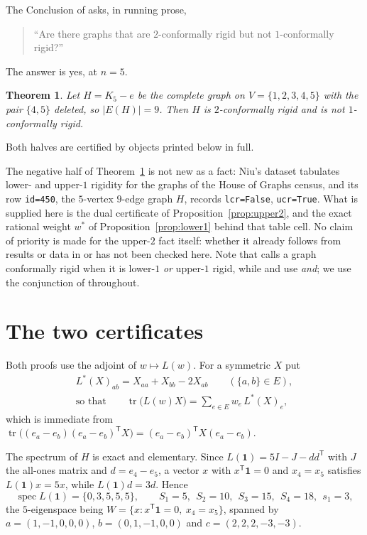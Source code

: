 \documentclass[11pt]{amsart}
\newtheorem{theorem}{Theorem}
\theoremstyle{remark}
\DeclareMathOperator{\tr}{tr}
\newcommand{\Lop}{L}
\newcommand{\Ladj}{L^{*}}
\begin{document}
The Conclusion of \cite{ACG} asks, in running prose,

\begin{quote}
``Are there graphs that are $2$-conformally rigid but not $1$-conformally rigid?''
\end{quote}

\noindent
The answer is yes, at $n=5$.

\begin{theorem}\label{thm:main}
Let $H=K_5-e$ be the complete graph on $V=\{1,2,3,4,5\}$ with the pair $\{4,5\}$ deleted,
so $|E(H)|=9$. Then $H$ is $2$-conformally rigid and is not $1$-conformally rigid.
\end{theorem}

Both halves are certified by objects printed below in full.

The negative half of Theorem~\ref{thm:main} is not new as a fact: Niu's dataset
\cite{Niu} tabulates lower- and upper-$1$ rigidity for the graphs of the House of Graphs
census, and its row \texttt{id=450}, the $5$-vertex $9$-edge graph $H$, records
\texttt{lcr=False}, \texttt{ucr=True}. What is supplied here is the dual certificate of
Proposition~\ref{prop:upper2}, and the exact rational weight $w^{*}$ of
Proposition~\ref{prop:lower1} behind that table cell. No claim of priority is made for
the upper-$2$ fact itself: whether it already follows from results or data in \cite{ACG}
or \cite{Niu} has not been checked here. Note that \cite{Niu} calls a graph
conformally rigid when it is lower-$1$ \emph{or} upper-$1$ rigid, while \cite{ST} and
\cite{ACG} use \emph{and}; we use the conjunction of \cite{ACG} throughout.

\section{The two certificates}

Both proofs use the adjoint of $w\mapsto\Lop(w)$. For a symmetric $X$ put
\begin{equation}\label{eq:adj}
\begin{gathered}
 \Ladj(X)_{ab}=X_{aa}+X_{bb}-2X_{ab}\qquad(\{a,b\}\in E),\\
 \text{so that}\qquad
 \tr\bigl(\Lop(w)X\bigr)=\sum_{e\in E}w_e\,\Ladj(X)_e ,
\end{gathered}
\end{equation}
which is immediate from
$\tr\bigl((e_a-e_b)(e_a-e_b)^{\mathsf T}X\bigr)=(e_a-e_b)^{\mathsf T}X(e_a-e_b)$.

The spectrum of $H$ is exact and elementary. Since $\Lop(\mathbf 1)=5I-J-dd^{\mathsf T}$
with $J$ the all-ones matrix and $d=e_4-e_5$, a vector $x$ with $x^{\mathsf T}\mathbf 1=0$
and $x_4=x_5$ satisfies $\Lop(\mathbf 1)x=5x$, while $\Lop(\mathbf 1)d=3d$. Hence
\begin{equation}\label{eq:spec}
 \operatorname{spec}\Lop(\mathbf 1)=\{0,3,5,5,5\},
 \qquad
 S_1=5,\ \ S_2=10,\ \ S_3=15,\ \ S_4=18,\ \ s_1=3 ,
\end{equation}
the $5$-eigenspace being $W=\{x:x^{\mathsf T}\mathbf 1=0,\ x_4=x_5\}$, spanned by
$a=(1,-1,0,0,0)$, $b=(0,1,-1,0,0)$ and $c=(2,2,2,-3,-3)$.
\end{document}
